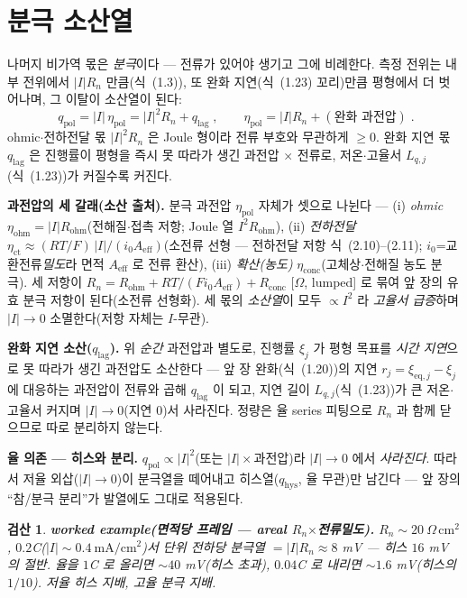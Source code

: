 \documentclass[11pt,a4paper]{article}
\newtheorem*{verifybox}{검산}
\newcommand{\eq}{\mathrm{eq}}
\newcommand{\hys}{\mathrm{hys}}
\newcommand{\pol}{\mathrm{pol}}
\newcommand{\ohm}{\mathrm{ohm}}
\newcommand{\lag}{\mathrm{lag}}
\begin{document}
\section{분극 소산열}\label{sec:h_pol}
나머지 비가역 몫은 \emph{분극}이다 — 전류가 있어야 생기고 그에 비례한다. 측정 전위는 내부 전위에서 $|I|R_n$
만큼(식~(1.3)), 또 완화 지연(식~(1.23) 꼬리)만큼 평형에서 더 벗어나며, 그 이탈이 소산열이 된다:
\begin{equation}
\boxed{\;q_\pol=|I|\,\eta_\pol=|I|^2R_n+q_\lag\;,\qquad \eta_\pol=|I|R_n+(\text{완화 과전압})\;.}
\label{eq:h_qpol}
\end{equation}
ohmic$\cdot$전하전달 몫 $|I|^2R_n$ 은 Joule 형이라 전류 부호와 무관하게 $\ge0$. 완화 지연 몫 $q_\lag$ 은 진행률이
평형을 즉시 못 따라가 생긴 과전압 $\times$ 전류로, 저온$\cdot$고율서 $L_{q,j}$(식~(1.23))가 커질수록 커진다.

\textbf{과전압의 세 갈래(소산 출처).} 분극 과전압 $\eta_\pol$ 자체가 셋으로 나뉜다 — (i) \emph{ohmic}
$\eta_\ohm=|I|R_\ohm$(전해질$\cdot$접촉 저항; Joule 열 $I^2R_\ohm$), (ii) \emph{전하전달} $\eta_\mathrm{ct}\approx
(RT/F)\,|I|/(i_0A_\mathrm{eff})$(소전류 선형 — 전하전달 저항 식~(2.10)–(2.11); $i_0$=교환전류\emph{밀도}라 면적
$A_\mathrm{eff}$ 로 전류 환산), (iii) \emph{확산(농도)}
$\eta_\mathrm{conc}$(고체상$\cdot$전해질 농도 분극). 세 저항이 $R_n=R_\ohm+RT/(Fi_0A_\mathrm{eff})+R_\mathrm{conc}$
[$\Omega$, lumped] 로 묶여 앞 장의 유효 분극 저항이 된다(소전류 선형화). 세 몫의 \emph{소산열}이 모두 $\propto I^2$ 라 \emph{고율서 급증}하며 $|I|\to0$ 소멸한다(저항 자체는 $I$-무관).

\textbf{완화 지연 소산($q_\lag$).} 위 \emph{순간} 과전압과 별도로, 진행률 $\xi_j$ 가 평형 목표를 \emph{시간 지연}으로
못 따라가 생긴 과전압도 소산한다 — 앞 장 완화(식~(1.20))의 지연 $r_j=\xi_{\eq,j}-\xi_j$ 에 대응하는 과전압이
전류와 곱해 $q_\lag$ 이 되고, 지연 길이 $L_{q,j}$(식~(1.23))가 큰 저온$\cdot$고율서 커지며 $|I|\to0$(지연 $0$)서
사라진다. 정량은 율 series 피팅으로 $R_n$ 과 함께 닫으므로 따로 분리하지 않는다.

\textbf{율 의존 — 히스와 분리.} $q_\pol\propto|I|^2$(또는 $|I|\times$과전압)라 $|I|\to0$ 에서 \emph{사라진다}.
따라서 저율 외삽($|I|\to0$)이 분극열을 떼어내고 히스열($q_\hys$, 율 무관)만 남긴다 — 앞 장의 ``참/분극
분리''가 발열에도 그대로 적용된다.
\begin{verifybox}
\textbf{worked example(면적당 프레임 — areal $R_n$$\times$전류밀도).} $R_n\sim20\ \Omega\,\mathrm{cm^2}$, $0.2$C($|I|\sim0.4\ \mathrm{mA/cm^2}$)서 단위 전하당
분극열 $=|I|R_n\approx8$ mV — 히스 $16$ mV 의 절반. 율을 $1$C 로 올리면 $\sim40$ mV(히스 초과), $0.04$C 로 내리면
$\sim1.6$ mV(히스의 $1/10$). \emph{저율 히스 지배, 고율 분극 지배}.
\end{verifybox}
\end{document}
